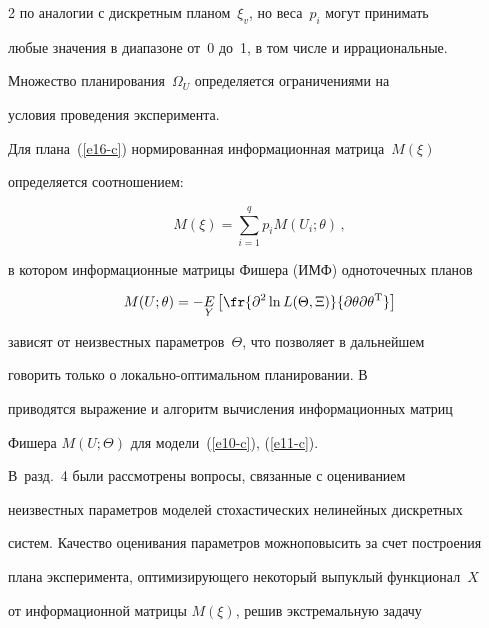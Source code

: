 \begin{multicols}{2}
по аналогии с дискретным планом~$\xi_v$, но веса~$p_i$ могут принимать


любые значения в диапазоне от~0 до~1, в том числе и иррациональные.


Множество планирования~$\Omega_U$ определяется ограничениями на


условия проведения эксперимента.





  Для плана~(\ref{e16-c}) нормированная информационная матрица~$M(\xi)$


определяется соотношением:


  \begin{equation}


  M(\xi)=\sum\limits_{i=1}^q p_i M(U_i;\theta)\,,\label{e17-c}


  \end{equation}


в котором информационные матрицы Фишера (ИМФ) одноточечных планов


$$


M(U;\theta)=- \underset{Y}{E} \left [ \fr{\partial^2\ln L(\Theta,


\Xi)}{\partial\theta\partial\theta^{\mathrm{T}}}\right]


$$


зависят от неизвестных параметров~$\Theta$, что позволяет в дальнейшем


говорить только о локально-оп\-ти\-маль\-ном планировании. В~\cite{19-c}


приводятся выражение и алгоритм вычисления информационных матриц


Фишера $M(U;\Theta)$ для модели~(\ref{e10-c}), (\ref{e11-c}).





  В~разд.~4 были рассмотрены вопросы, связанные с оцениванием


неизвестных параметров мо\-делей стохастических нелинейных дискретных


сис\-тем. Качество оценивания параметров можно\linebreak повысить за счет построения


плана эксперимента, оптимизирующего некоторый выпуклый функционал~$X$


от информационной матрицы $M(\xi)$, решив экстремальную задачу


  \begin{equation}



\end{equation}
\end{multicols}

